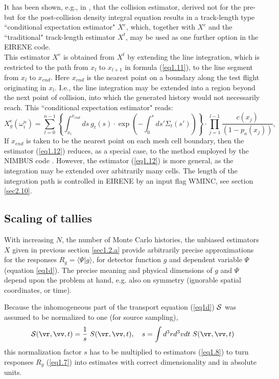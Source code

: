 It has been shown, e.g., in
\cite{kn:Spanier69a}, that the collision estimator, derived not
for the pre- but for the post-collision density integral equation
results in a track-length type ``conditional expectation
estimator" $ X^e$, which, together with $X^c$ and the
``traditional" track-length estimator $ X^t$, may be used as one
further option in the EIRENE code.
\\ This estimator $ X^e$ is obtained from $ X^t$ by
extending the line integration, which is restricted to the path
from $ x_l$ to $ x_{l+1}$ in formula (\ref{eq1.11}), to the line
segment from $ x_l$ to $ x_{end}$. Here $ x_{end}$ is the nearest
point on a boundary along the test flight originating in $ x_l$.
I.e., the line integration may be extended into a region beyond
the next point of collision, into which the generated history
would not necessarily reach. This ``conditional expectation
estimator" reads:
\begin{equation} \label{eq1.12}
 X^e_g ( \omega^n_i )   =
  \sum_{l=0}^{n-1}  \left \{ \int_{x_l}^{x_{end}}
ds \  g_t (s)    \cdot   \exp \left (
 - \int_{0}^{s} ds '   \Sigma_t (
  s ' ) \right ) \right \}
   \cdot   \prod_{j=1}^{l-1}
 \frac{c(x_j )}{(1 - p_a(x_j))}   ,
\end{equation}
If $ x_{end}$ is taken to be the nearest point on each mesh cell
boundary, then the estimator (\ref{eq1.12}) reduces, as a special
case, to the method employed by the NIMBUS code \cite{kn:Cupini}.
However, the estimator (\ref{eq1.12}) is more general, as the
integration may be extended over arbitrarily many cells. The
length of the integration path is controlled in EIRENE by an input
flag WMINC, see section \ref{sec2.10}.


\subsection{Scaling of tallies}\label{sec1.2.0}
With increasing $N$, the number of Monte Carlo histories,
the unbiased estimators $X$ given in previous section \ref{sec1.2.a} provide arbitrarily precise approximations for the responses $R_g=\langle\Psi|g\rangle$,
for detector function $g$ and dependent variable $\Psi$ (equation \ref{eq1d}). The precise meaning and physical dimensions of $g$ and $\Psi$
depend upon the problem at hand, e.g. also on symmetry (ignorable spatial coordinates, or time).

Because the inhomogeneous part of the transport equation (\ref{eq1d}) $\cal{S}$ was assumed to be normalized to one (for source
sampling),
\begin{equation}\label{scale}
{\cal{S}} (\vr,\vv,t)=\frac{1}{s} \ S(\vr,\vv,t), \quad  s =\int  d^3rd^3vdt\ S(\vr,\vv,t)
\end{equation}
this normalization factor $s$ has to be multiplied to estimators (\ref{eq1.8}) to turn responses $R_g$ (\ref{eq1.7}) into
estimates with correct dimensionality and in absolute units.

